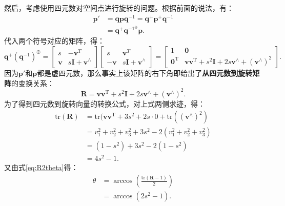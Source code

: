 然后，考虑使用四元数对空间点进行旋转的问题。根据前面的说法，有：
\begin{equation}
\begin{split}
\bm{p}' &= \bm{q} \bm{p} \bm{q}^{-1} = \bm{q}^+ \bm{p}^+ \bm{q}^{-1} \\
&= \bm{q}^+ \bm{q}^{{-1}^{\oplus}} \bm{p}.
\end{split}
\end{equation}
代入两个符号对应的矩阵，得：
\begin{equation}\label{eq:quaternion-to-rotation-matrix-derive}
{\bm{q}^ + }{\left( {{\bm{q}^{ - 1}}} \right)^ \oplus } = \left[ \begin{array}{*{20}{c}}
	s&-\bm{v}^T\\
	\bm{v}&s\bm{I}+\bm{v}^\wedge 
	\end{array} \right]\left[\begin{array}{*{20}{c}}
	s&{\bm{v} ^T}\\
	{ - \bm{v} }&{s\bm{I} + \bm{v} ^ \wedge }
	\end{array} \right] = \left[ \begin{array}{*{20}{c}}
	1&\bm{0} \\
	\bm{0}^\mathrm{T}&\bm{v}\bm{v}^\mathrm{T} + {s^2} \bm{I} + 2s\bm{v} ^ \wedge + {(\bm{v} ^ \wedge)}^2 
	\end{array} \right].
\end{equation}
因为$\bm{p}'$和$\bm{p}$都是虚四元数，那么事实上该矩阵的右下角即给出了\textbf{从四元数到旋转矩阵}的变换关系：
\begin{equation}
\bm{R} = \bm{v} \bm{v}^\mathrm{T} + {s^2} \bm{I} + 2s\bm{v} ^ \wedge + {(\bm{v} ^ \wedge)}^2.
\end{equation}
为了得到四元数到旋转向量的转换公式，对上式两侧求迹，得：
\begin{equation}
\begin{aligned}
\mathrm{tr}(\bm{R}) &= \mathrm{tr}(\bm{v}\bm{v}^\mathrm{T} + 3s^2 + 2s \cdot 0 + \mathrm{tr}((\bm{v}^\wedge)^2) \\
&= v_1^2+v_2^2+v_3^2 + 3s^2 - 2(v_1^2+v_2^2+v_3^2) \\
&= (1-s^2) + 3s^2 -2(1-s^2)\\
&= 4s^2 -1.
\end{aligned}
\end{equation}
又由式\eqref{eq:R2theta}得：
\begin{equation}
\begin{aligned}
\theta &= \arccos(\frac{\mathrm{tr}(\bm{R}-1)}{2}) \\
&=\arccos(2s^2-1).
\end{aligned}
\end{equation}
